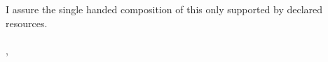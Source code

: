 \thispagestyle{empty}
\vspace*{0.8\textheight}
\noindent
I assure the single handed composition of this \MakeLowercase{\getDoctype{}} only supported by declared resources. \\ \vspace{15mm} \\ \noindent
\getSubmissionLocation{}, \getSubmissionDate{} \hspace{1cm} \getAuthor{}
\cleardoublepage{}